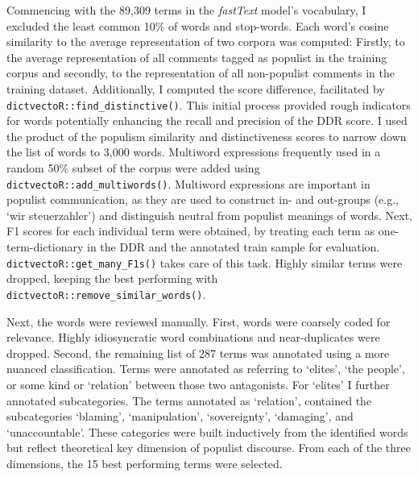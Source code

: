 \documentclass[
]{ccr}
\begin{document}
Commencing with the 89,309 terms in the \emph{fastText} model's
vocabulary, I excluded the least common 10\% of words and stop-words.
Each word's cosine similarity to the average representation of two
corpora was computed: Firstly, to the average representation of all
comments tagged as populist in the training corpus and secondly, to the
representation of all non-populist comments in the training dataset.
Additionally, I computed the score difference, facilitated by
\texttt{dictvectoR::find\_distinctive()}. This initial process provided
rough indicators for words potentially enhancing the recall and
precision of the DDR score. I used the product of the populism
similarity and distinctiveness scores to narrow down the list of words
to 3,000 words. Multiword expressions frequently used in a random 50\%
subset of the corpus were added using
\texttt{dictvectoR::add\_multiwords()}. Multiword expressions are
important in populist communication, as they are used to construct in-
and out-groups (e.g., `wir steuerzahler') and distinguish neutral from
populist meanings of words. Next, F1 scores for each individual term
were obtained, by treating each term as one-term-dictionary in the DDR
and the annotated train sample for evaluation.
\texttt{dictvectoR::get\_many\_F1s()} takes care of this task. Highly
similar terms were dropped, keeping the best performing with
\texttt{dictvectoR::remove\_similar\_words()}.

Next, the words were reviewed manually. First, words were coarsely coded
for relevance. Highly idiosyncratic word combinations and
near-duplicates were dropped. Second, the remaining list of 287 terms
was annotated using a more nuanced classification. Terms were annotated
as referring to `elites', `the people', or some kind or `relation'
between those two antagonists. For `elites' I further annotated
subcategories. The terms annotated as `relation', contained the
subcategories `blaming', `manipulation', `sovereignty', `damaging', and
`unaccountable'. These categories were built inductively from the
identified words but reflect theoretical key dimension of populist
discourse. From each of the three dimensions, the 15 best performing
terms were selected.
\end{document}
